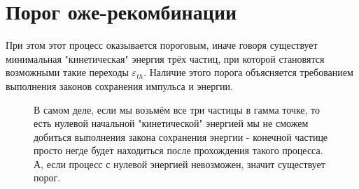 \documentclass[../main.tex]{subfiles}
\begin{document}
    \section{Порог оже-рекомбинации}

        При этом этот процесс оказывается пороговым, иначе говоря существует минимальная "кинетическая"
    энергия трёх частиц, при которой становятся возможными такие переходы $\varepsilon_{th}$. Наличие этого 
    порога объясняется требованием выполнения законов сохранения импульса и энергии. 
    
    \begin{figure}[h!!!]
        \begin{minipage}[h]{0.66\linewidth}
        В самом деле,
        если мы возьмём все три частицы в гамма точке, то есть нулевой
        начальной "кинетической" энергией мы не сможем добиться выполнения закона сохранения энергии - 
        конечной частице просто негде будет находиться после прохождения такого процесса.
        А, если процесс с нулевой энергией невозможен, значит существует порог.
        \end{minipage}
        \hfill
        \begin{minipage}[h]{0.33\linewidth}
            \begin{center}
            \end{center}
        \end{minipage}
    \end{figure}
\end{document}
